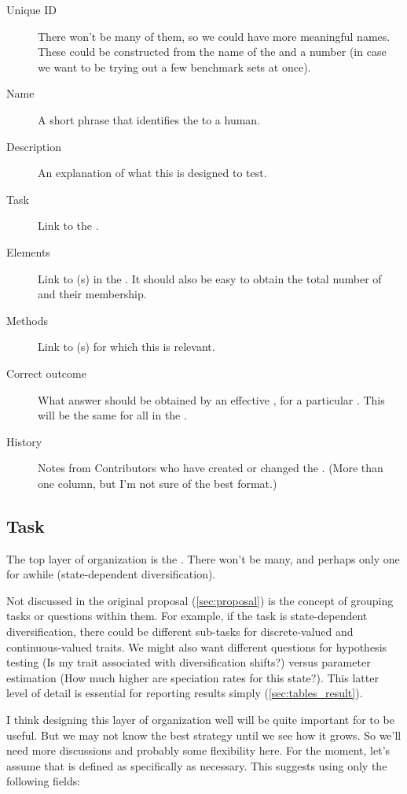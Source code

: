 \begin{description}
    \item[Unique ID] There won't be many of them, so we could have more meaningful names.  These could be constructed from the name of the \Task and a number (in case we want to be trying out a few benchmark sets at once).
    \item[Name] A short phrase that identifies the \Benchmark to a human.
    \item[Description] An explanation of what this \Benchmark is designed to test.
    \item[Task] Link to the \Task.
    \item[Elements] Link to \Element(s) in the \Benchmark.  It should also be easy to obtain the total number of \Elements and their \Refset membership.
    \item[Methods] Link to \Method(s) for which this \Benchmark is relevant.
    \item[Correct outcome] What answer should be obtained by an effective \Method, for a particular \Task.  This will be the same for all \Elements in the \Benchmark.
    \item[History] Notes from Contributors who have created or changed the \Benchmark.  (More than one column, but I'm not sure of the best format.)
\end{description}

\subsection{Task}
\label{sec:tables_task}

The top layer of organization is the \Task.
There won't be many, and perhaps only one for awhile (\ie state-dependent diversification).

Not discussed in the original proposal (\cref{sec:proposal}) is the concept of grouping tasks or questions within them.
For example, if the task is state-dependent diversification, there could be different sub-tasks for discrete-valued and continuous-valued traits.
We might also want different questions for hypothesis testing (Is my trait associated with diversification shifts?) versus parameter estimation (How much higher are speciation rates for this state?).
This latter level of detail is essential for reporting results simply (\cref{sec:tables_result}).

I think designing this layer of organization well will be quite important for \phycomb to be useful.
But we may not know the best strategy until we see how it grows.
So we'll need more discussions and probably some flexibility here.
For the moment, let's assume that \Task is defined as specifically as necessary.
This suggests using only the following fields:

